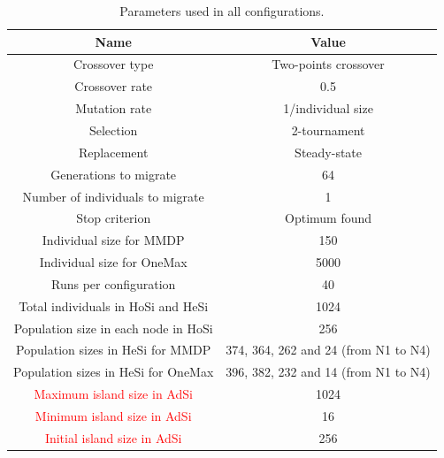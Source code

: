 \documentclass[final,1p,times]{elsarticle}
\begin{document}
\begin{table}
\centering
\caption{Parameters used in all configurations.}
\begin{tabular}{|c|c|} \hline
Name & Value\\ \hline

Crossover type & Two-points crossover \\ \hline
Crossover rate & 0.5\\ \hline
Mutation rate & 1/individual size\\ \hline
Selection & 2-tournament \\ \hline
Replacement & Steady-state\\ \hline
Generations to migrate & 64 \\ \hline
Number of individuals to migrate & 1 \\ \hline
Stop criterion & Optimum found \\ \hline
Individual size for MMDP & 150 \\ \hline
Individual size for OneMax & 5000 \\ \hline
Runs per configuration & 40 \\ \hline
\hline
Total individuals in HoSi and HeSi & 1024\\ \hline \hline
Population size in each node in HoSi & 256  \\ \hline
Population sizes in HeSi for MMDP & 374, 364, 262 and 24 (from N1 to N4)\\ \hline
Population sizes in HeSi for OneMax & 396,  382, 232 and 14 (from N1 to N4)\\ \hline
\hline
\textcolor{red}{Maximum island size in AdSi} & 1024 \\ \hline
\textcolor{red}{Minimum island size in AdSi} & 16 \\ \hline
\textcolor{red}{Initial island size in AdSi} & 256 \\ \hline 
\end{tabular}
\label{table:parameters}
\end{table}
\end{document}
